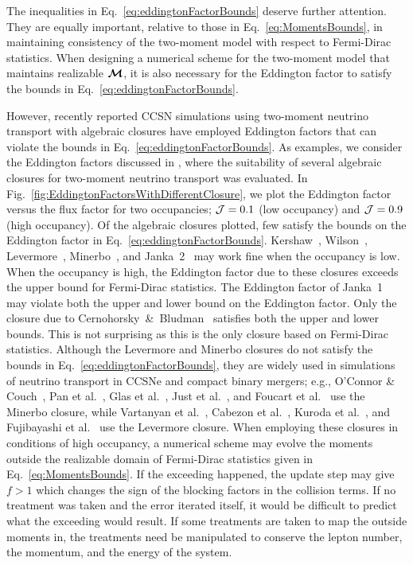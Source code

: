 The inequalities in Eq.~\eqref{eq:eddingtonFactorBounds} deserve further attention.  
They are equally important, relative to those in Eq.~\eqref{eq:MomentsBounds}, in maintaining consistency of the two-moment model with respect to Fermi-Dirac statistics.  
When designing a numerical scheme for the two-moment model that maintains realizable $\boldsymbol{\mathcal{M}}$, it is also necessary for the Eddington factor to satisfy the bounds in Eq.~\eqref{eq:eddingtonFactorBounds}.  

However, recently reported CCSN simulations using two-moment neutrino transport with algebraic closures have employed Eddington factors that can violate the bounds in Eq.~\eqref{eq:eddingtonFactorBounds}.  
As examples, we consider the Eddington factors discussed in \cite{murchikova_etal_2017}, where the suitability of several algebraic closures for two-moment neutrino transport was evaluated.  
In Fig.~\ref{fig:EddingtonFactorsWithDifferentClosure}, we plot the Eddington factor versus the flux factor for two occupancies; $\mathcal{J} = 0.1$ (low occupancy) and $\mathcal{J} = 0.9$ (high occupancy).  
Of the algebraic closures plotted, few satisfy the bounds on the Eddington factor in Eq.~\eqref{eq:eddingtonFactorBounds}.  
Kershaw~\cite{kershaw_1976}, Wilson~\cite{wilson_1975,leblancWilson_1970}, Levermore~\cite{levermore_1984}, Minerbo~\cite{minerbo_1978}, and Janka~2~\cite{janka_1992} may work fine when the occupancy is low.  
When the occupancy is high, the Eddington factor due to these closures exceeds the upper bound for Fermi-Dirac statistics.  
The Eddington factor of Janka~1~\cite{janka_1991} may violate both the upper and lower bound on the Eddington factor.  
Only the closure due to Cernohorsky~\&~Bludman~\cite{cernohorskyBludman_1994} satisfies both the upper and lower bounds.  
This is not surprising as this is the only closure based on Fermi-Dirac statistics.  
Although the Levermore and Minerbo closures do not satisfy the bounds in Eq.~\eqref{eq:eddingtonFactorBounds}, they are widely used in simulations of neutrino transport in CCSNe and compact binary mergers; e.g., O'Connor \& Couch~\cite{oConnorCouch_2018}, Pan et al.~\cite{pan_etal_2018}, Glas et al.~\cite{glas_etal_2018}, Just et al.~\cite{just_etal_2018}, and Foucart et al.~\cite{foucart_etal_2015} use the Minerbo closure, while Vartanyan et al.~\cite{vartanyan_etal_2018}, Cabezon et al.~\cite{cabezon_etal_2018}, Kuroda et al.~\cite{kuroda_etal_2016}, and Fujibayashi et al.~\cite{fujibayashi_etal_2017} use the Levermore closure.  
When employing these closures in conditions of high occupancy, a numerical scheme may evolve the moments outside the realizable domain of Fermi-Dirac statistics given in Eq.~\eqref{eq:MomentsBounds}.
If the exceeding happened, the update step may give $f>1$ which changes the sign of the blocking factors in the collision terms.
If no treatment was taken and the error iterated itself, it would be difficult to predict what the exceeding would result.
If some treatments are taken to map the outside moments in, the treatments need be manipulated to conserve the lepton number, the momentum, and the energy of the system.

